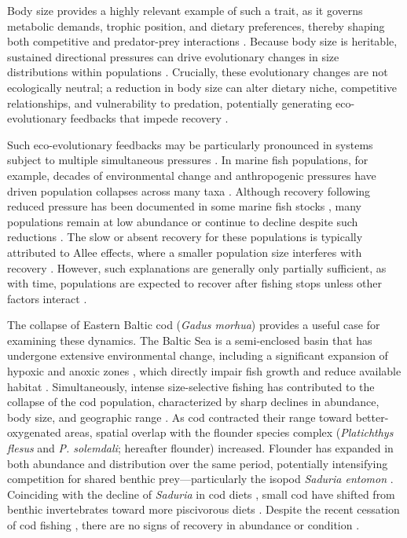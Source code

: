 \documentclass[12pt]{article}
\begin{document}
Body size provides a highly relevant example of such a trait, as it governs metabolic demands, trophic position, and dietary preferences, thereby shaping both competitive and predator-prey interactions \citep{Ahti2020, Beverton2012}. Because body size is heritable, sustained directional pressures can drive evolutionary changes in size distributions within populations \citep{Nielsen2014, Kuparinen2017}. Crucially, these evolutionary changes are not ecologically neutral; a reduction in body size can alter dietary niche, competitive relationships, and vulnerability to predation, potentially generating eco-evolutionary feedbacks that impede recovery \citep{Edeline2021}.


Such eco-evolutionary feedbacks may be particularly pronounced in systems subject to multiple simultaneous pressures \citep{cote2016interactions, crain2008interactive, cuenca2021evolutionary}. In marine fish populations, for example, decades of environmental change and anthropogenic pressures have driven population collapses across many taxa  \citep{Hutchings2004, Neubauer2013}. Although recovery following reduced pressure has been documented in some marine fish stocks \citep{Hilborn2009, Duarte2020}, many populations remain at low abundance or continue to decline despite such reductions \citep{Kuparinen2014, Neuenhoff2019}. The slow or absent recovery for these populations is typically attributed to Allee effects, where a smaller population size interferes with recovery \citep{Kuparinen2014}. However, such explanations are generally only partially sufficient, as with time, populations are expected to recover after fishing stops unless other factors interact \citep{Neuenhoff2019}.


The collapse of Eastern Baltic cod (\textit{Gadus morhua}) provides a useful case for examining these dynamics. The Baltic Sea is a semi-enclosed basin that has undergone extensive environmental change, including a significant expansion of hypoxic and anoxic zones \citep{Carstensen2014}, which directly impair fish growth and reduce available habitat \citep{Casini2016, Bartolino2017, Orio2019, Orio2020, Lindmark2023}. Simultaneously, intense size-selective fishing has contributed to the collapse of the cod population, characterized by sharp declines in abundance, body size, and geographic range \citep{Orio2020, ICES2022}. As cod contracted their range toward better-oxygenated areas, spatial overlap with the flounder species complex (\textit{Platichthys flesus} and \textit{P. solemdali}; hereafter flounder) increased. Flounder has expanded in both abundance \citep{ICES_18645_2025, ICES2022} and distribution \citep{Orio2020} over the same period, potentially intensifying competition for shared benthic prey---particularly the isopod \textit{Saduria entomon} \citep{Haase2020}. Coinciding with the decline of \textit{Saduria} in cod diets \citep{Haase2020}, small cod have shifted from benthic invertebrates toward more piscivorous diets \citep{ICES2015, Haase2020}. Despite the recent cessation of cod fishing \citep{ICES2022}, there are no signs of recovery in abundance or condition \citep{ICES2022}.
\end{document}
